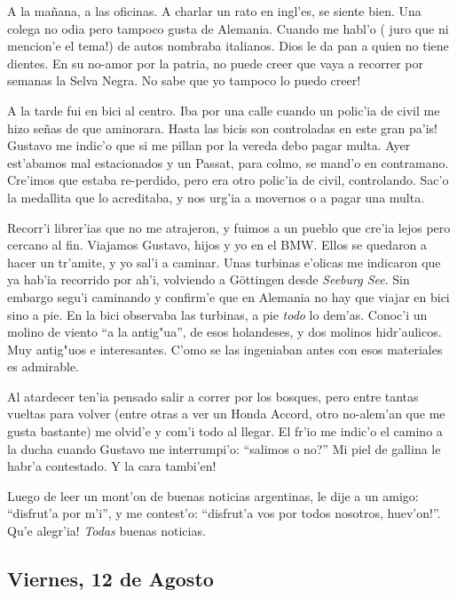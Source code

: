 A la ma\~nana, a las oficinas. A charlar un rato en ingl'es, se siente bien. Una
colega no odia pero tampoco gusta de Alemania. Cuando me habl'o (\textexclamdown
juro que ni mencion'e el tema!) de autos nombraba italianos. Dios le da pan a
quien no tiene dientes. En su no-amor por la patria, no puede creer que vaya a
recorrer por semanas la Selva Negra. \textexclamdown No sabe que yo tampoco lo
puedo creer!

A la tarde fui en bici al centro. Iba por una calle cuando un polic'ia de civil
me hizo se\~nas de que aminorara. \textexclamdown Hasta las bicis son
controladas en este gran pa'is! Gustavo me indic'o que si me pillan por la
vereda debo pagar multa. Ayer est'abamos mal estacionados y un
Passat, para colmo, se mand'o en contramano. Cre'imos que estaba re-perdido,
pero era otro polic'ia de civil, controlando. Sac'o la medallita que lo
acreditaba, y nos urg'ia a movernos o a pagar una multa.

Recorr'i librer'ias que no me atrajeron, y fuimos a un pueblo que cre'ia
lejos pero cercano al fin. Viajamos Gustavo, hijos y yo en el {\small BMW}.
Ellos se quedaron a hacer un tr'amite, y yo sal'i a caminar. Unas turbinas
e'olicas me indicaron que ya hab'ia recorrido por ah'i, volviendo a
G\"ottingen desde \emph{Seeburg See}. Sin embargo segu'i caminando y confirm'e
que en Alemania no hay que viajar en bici sino a pie. En la bici observaba las
turbinas, a pie \emph{todo} lo dem'as. Conoc'i un molino de viento ``a la
antig"ua'', de esos holandeses, y dos molinos hidr'aulicos. Muy antig"uos e
interesantes. C'omo se las ingeniaban antes con esos materiales es admirable.

Al atardecer ten'ia pensado salir a correr por los bosques, pero entre tantas
vueltas para volver (entre otras a ver un Honda Accord, otro no-alem'an que me
gusta bastante) me olvid'e y com'i todo al llegar. El fr'io me indic'o el camino
a la ducha cuando Gustavo me interrumpi'o: ``\textquestiondown salimos o no?''
Mi piel de gallina le habr'a contestado. \textexclamdown Y la cara tambi'en!

Luego de leer un mont'on de buenas noticias argentinas, le dije a un amigo:
``disfrut'a por m'i'', y me contest'o: ``disfrut'a vos por todos nosotros,
\textexclamdown huev'on!''. \textexclamdown Qu'e alegr'ia! \emph{Todas} buenas
noticias.

\subsection*{Viernes, 12 de Agosto}

